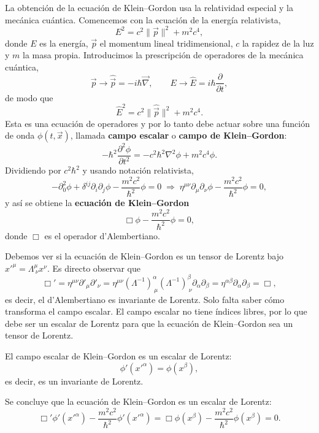 La obtención de la ecuación de Klein--Gordon usa la relatividad especial
y la mecánica cuántica. Comencemos con la ecuación de la energía
relativista,
\[
E^2=c^2\|\vec p\|^2+m^2c^4, \tag{144}
\]
donde $E$ es la energía, $\vec p$ el momentum lineal tridimensional, $c$
la rapidez de la luz y $m$ la masa propia. Introducimos la prescripción
de operadores de la mecánica cuántica,
\[
\vec p\to\hat{\vec p}=-i\hbar\vec\nabla, \qquad E\to\hat E=i\hbar
\frac{\partial}{\partial t}, \tag{145}
\]
de modo que
\[
\hat E^2=c^2\|\hat{\vec p}\|^2+m^2c^4. \tag{146}
\]
Esta es una ecuación de operadores y por lo tanto debe actuar sobre una
función de onda $\phi(t,\vec x)$, llamada \textbf{campo escalar} o
\textbf{campo de Klein--Gordon}:
\[
-\hbar^2\frac{\partial^2\phi}{\partial t^2}=-c^2\hbar^2\nabla^2\phi+m^2c^4
\phi. \tag{147}
\]
Dividiendo por $c^2\hbar^2$ y usando notación relativista,
\[
-\partial_0^2\phi+\delta^{ij}\partial_i\partial_j\phi-\frac{m^2c^2}{\hbar^2}
\phi=0\;\Longrightarrow\;\eta^{\mu\nu}\partial_\mu\partial_\nu\phi-
\frac{m^2c^2}{\hbar^2}\phi=0,
\]
y así se obtiene la \textbf{ecuación de Klein--Gordon}
\[
\Box\phi-\frac{m^2c^2}{\hbar^2}\phi=0, \tag{148}
\]
donde $\Box$ es el operador d'Alembertiano.

Debemos ver si la ecuación de Klein--Gordon es un tensor de Lorentz bajo
$x'^\mu=\Lambda^\mu_{\ \nu}x^\nu$. Es directo observar que
\[
\Box'=\eta^{\mu\nu}\partial'_\mu\partial'_\nu=\eta^{\mu\nu}(\Lambda^{-1})^
\alpha_{\ \mu}(\Lambda^{-1})^\beta_{\ \nu}\partial_\alpha\partial_\beta=
\eta^{\alpha\beta}\partial_\alpha\partial_\beta=\Box, \tag{149}
\]
es decir, el d'Alembertiano es invariante de Lorentz. Solo falta saber
cómo transforma el campo escalar. El campo escalar no tiene índices
libres, por lo que debe ser un escalar de Lorentz para que la ecuación
de Klein--Gordon sea un tensor de Lorentz.

\begin{definicion}
El campo escalar de Klein--Gordon es un escalar de Lorentz:
\[
\phi'(x'^\alpha)=\phi(x^\beta), \tag{150}
\]
es decir, es un invariante de Lorentz.
\end{definicion}

Se concluye que la ecuación de Klein--Gordon es un escalar de Lorentz:
\[
\Box'\phi'(x'^\alpha)-\frac{m^2c^2}{\hbar^2}\phi'(x'^\alpha)=\Box\phi(x^
\beta)-\frac{m^2c^2}{\hbar^2}\phi(x^\beta)=0. \tag{151}
\]


